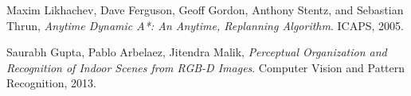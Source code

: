 \documentclass[10pt]{article}
\begin{document}
\begin{thebibliography}{9}

  Maxim Likhachev, Dave Ferguson, Geoff Gordon, Anthony Stentz, and Sebastian Thrun,
  \emph{Anytime Dynamic A*: An Anytime, Replanning Algorithm}.
  ICAPS,
  2005.

  Saurabh Gupta, Pablo Arbelaez, Jitendra Malik,
  \emph{Perceptual Organization and Recognition of Indoor Scenes from RGB-D Images}.
  Computer Vision and Pattern Recognition,
  2013.

\end{thebibliography}
\end{document}

